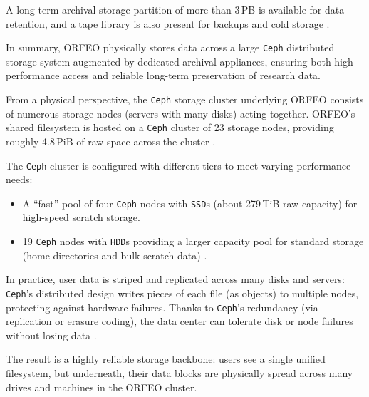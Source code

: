 A long-term archival storage partition of more than 3\,PB is available for data 
retention, and a tape library is also present for backups and cold 
storage \parencite{ORFEO_Docs_Storage,orfeo-changelog-2024}. 

\medskip

In summary, ORFEO physically stores data across a large \texttt{Ceph} 
distributed storage system augmented by dedicated archival appliances, ensuring 
both high-performance access and reliable long-term preservation of research 
data.

\medskip

From a physical perspective, the \texttt{Ceph} storage cluster underlying ORFEO 
consists of numerous storage nodes (servers with many disks) acting together. 
ORFEO’s shared filesystem is hosted on a \texttt{Ceph} cluster of 23 storage 
nodes, providing roughly 4.8\,PiB of raw space across the 
cluster \parencite{ORFEO_Docs_Storage,orfeo-changelog-2024}. 

The \texttt{Ceph} cluster is configured with different tiers to meet varying 
performance needs:
\begin{itemize}
	\item A “fast” pool of four \texttt{Ceph} nodes with \texttt{SSD}s (about 
	279\,TiB raw capacity) for high-speed scratch storage.
	\item 19 \texttt{Ceph} nodes with \texttt{HDD}s providing a larger capacity 
	pool for standard storage (home directories and bulk scratch 
	data) \parencite{ORFEO_Docs_Storage}.
\end{itemize}

In practice, user data is striped and replicated across many disks and servers: 
\texttt{Ceph}’s distributed design writes pieces of each file (as objects) to 
multiple nodes, protecting against hardware failures. Thanks to \texttt{Ceph}’s 
redundancy (via replication or erasure coding), the data center can tolerate 
disk or node failures without losing data \parencite{Ceph_RADOS,Ceph_Pools,Ceph_EC}. 

The result is a highly reliable storage backbone: users see a single unified 
filesystem, but underneath, their data blocks are physically spread across many 
drives and machines in the ORFEO cluster.

\medskip

